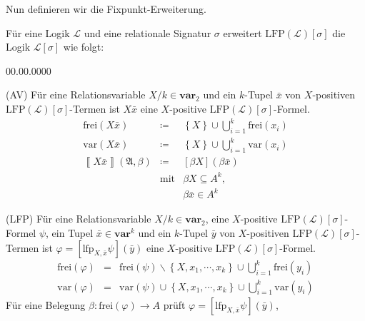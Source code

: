 Nun definieren wir die Fixpunkt-Erweiterung.
\begin{defn}
\label{def:lfp}Für eine Logik $\mathcal{L}$ und eine relationale
Signatur $\sigma$ erweitert $\mathrm{LFP}\left(\mathcal{L}\right)\left[\sigma\right]$
die Logik $\mathcal{L}\left[\sigma\right]$ wie folgt:
\end{defn}
\begin{labeling}{00.00.0000}
\item [{(AV)}] Für eine Relationsvariable $X/k\in\mathbf{var}_{2}$ und
ein $k$-Tupel $\bar{x}$ von $X$-positiven $\mathrm{LFP}\left(\mathcal{L}\right)\left[\sigma\right]$-Termen
ist $X\bar{x}$ eine $X$-positive $\mathrm{LFP\left(\mathcal{L}\right)}\left[\sigma\right]$-Formel.
\begin{eqnarray*}
\mathrm{frei}\left(X\bar{x}\right) & \coloneqq & \left\{ X\right\} \cup\bigcup_{i=1}^{k}\mathrm{frei}\left(x_{i}\right)\\
\mathrm{var}\left(X\bar{x}\right) & \coloneqq & \left\{ X\right\} \cup\bigcup_{i=1}^{k}\mathrm{var}\left(x_{i}\right)\\
\left\llbracket X\bar{x}\right\rrbracket \left(\mathfrak{A},\beta\right) & \coloneqq & \left[\beta X\right]\left(\beta\bar{x}\right)\\
 & \mathrm{mit} & \beta X\subseteq A^{k},\\
 &  & \beta\bar{x}\in A^{k}
\end{eqnarray*}
\item [{(LFP)}] Für eine Relationsvariable $X/k\in\mathbf{var}_{2}$, eine
$X$-positive $\mathrm{LFP}\left(\mathcal{L}\right)\left[\sigma\right]$-Formel
$\psi$, ein Tupel $\bar{x}\in\mathbf{var}^{k}$ und ein $k$-Tupel
$\bar{y}$ von $X$-positiven $\mathrm{\mathrm{LFP}\left(\mathcal{L}\right)}\left[\sigma\right]$-Termen
ist $\varphi=\left[\mathrm{lfp}_{X,\bar{x}}\psi\right]\left(\bar{y}\right)$
eine $X$-positive $\mathrm{LFP}\left(\mathrm{\mathcal{L}}\right)\left[\sigma\right]$-Formel.
\begin{eqnarray*}
\mathrm{frei}\left(\varphi\right) & = & \mathrm{frei}\left(\psi\right)\backslash\left\{ X,x_{1},\cdots,x_{k}\right\} \cup\bigcup_{i=1}^{k}\mathrm{frei}\left(y_{i}\right)\\
\mathrm{var}\left(\varphi\right) & = & \mathrm{var}\left(\psi\right)\cup\left\{ X,x_{1},\cdots,x_{k}\right\} \cup\bigcup_{i=1}^{k}\mathrm{var}\left(y_{i}\right)
\end{eqnarray*}
Für eine Belegung $\beta:\mathrm{frei}\left(\varphi\right)\rightarrow A$
prüft $\varphi=\left[\mathrm{lfp}_{X,\bar{x}}\psi\right]\left(\bar{y}\right)$,

\end{labeling}
